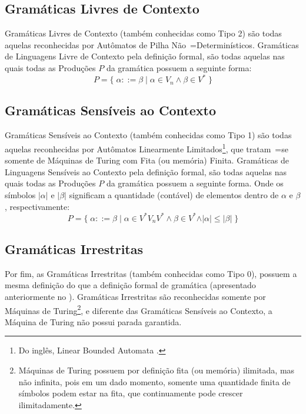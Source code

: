 \subsection{Gramáticas Livres de Contexto}

Gramáticas Livres de Contexto (também conhecidas como Tipo 2) \cite{hopcroftBook} são todas aquelas reconhecidas por Autômatos de Pilha Não~=Determinísticos.
Gramáticas de Linguagens Livre de Contexto pela definição formal,
são todas aquelas nas quais todas as Produções $P$ da gramática possuem a seguinte forma:
$$ P = \{\; \alpha ::= \beta \;|\; \alpha \in V_n \land \beta \in V^* \;\} $$


\subsection{Gramáticas Sensíveis ao Contexto}

Gramáticas Sensíveis ao Contexto (também conhecidas como Tipo 1) são todas aquelas reconhecidas por Autômatos Linearmente Limitados\footnote{
Do inglês,
Linear Bounded Automata \cite{fundamentalsOfTheoreticalComputerScience}.
},
que tratam~=se somente de Máquinas de Turing \cite{sipserBook} com Fita (ou memória) Finita.
Gramáticas de Linguagens Sensíveis ao Contexto pela definição formal,
são todas aquelas nas quais todas as Produções $P$ da gramática possuem a seguinte forma.
Onde os símbolos $\vert\alpha\vert$ e
$\vert\beta\vert$ significam a quantidade (contável) de elementos dentro de $\alpha$ e
$\beta$,
respectivamente:
$$ P = \{\; \alpha ::= \beta \;|\; \alpha \in V^* V_n V^* \land \beta \in V^*
            \land \vert\alpha\vert \leq \vert\beta\vert \;\} $$


\subsection{Gramáticas Irrestritas}

Por fim,
as Gramáticas Irrestritas (também conhecidas como Tipo 0),
possuem a mesma definição do que a definição formal de gramática (apresentado anteriormente no
).
Gramáticas Irrestritas são reconhecidas somente por Máquinas de Turing\footnote{
Máquinas de Turing possuem por definição fita (ou memória) ilimitada,
mas não infinita,
pois em um dado momento,
somente uma quantidade finita de símbolos podem estar na fita,
que continuamente pode crescer ilimitadamente.
},
e diferente das Gramáticas Sensíveis ao Contexto,
a Máquina de Turing não possui parada garantida.

